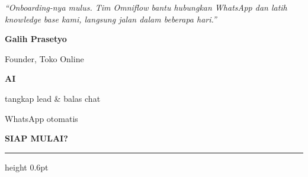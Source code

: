 \documentclass[a4paper]{article}
\newcommand{\sectiontitle}[1]{%
    \vspace{10pt}%
    {\fontsize{13}{16}\selectfont\bfseries\color{BlueDark} #1}\par\vspace{3pt}%
    {\color{BluePrimary}\hrule height 0.6pt}\par\vspace{8pt}%
}
\begin{document}
\noindent
\begin{minipage}[t]{0.485\textwidth}
    \colorbox{BlueBg}{%
        \begin{minipage}{\dimexpr\linewidth-2\fboxsep\relax}
            {\fontsize{9.5}{13}\selectfont\color{TextDark}\textit{``Onboarding-nya mulus. Tim Omniflow bantu hubungkan WhatsApp dan latih knowledge base kami, langsung jalan dalam beberapa hari.''}}\par\vspace{4pt}
            {\fontsize{8.5}{11}\selectfont\bfseries\color{BluePrimary} Galih Prasetyo}\par
            {\fontsize{8}{10}\selectfont\color{TextLight} Founder, Toko Online}
        \end{minipage}}
\end{minipage}%
\hfill
\begin{minipage}[t]{0.485\textwidth}
    \colorbox{BlueBg}{%
        \begin{minipage}{\dimexpr\linewidth-2\fboxsep\relax}
            \begin{center}
                {\fontsize{20}{24}\selectfont\bfseries\color{BluePrimary} AI}\par
                {\fontsize{9.5}{12}\selectfont\color{TextDark} tangkap lead \& balas chat}\par
                {\fontsize{9.5}{12}\selectfont\color{TextDark} WhatsApp otomatis}
            \end{center}
        \end{minipage}}
\end{minipage}

\sectiontitle{SIAP MULAI?}
\end{document}

